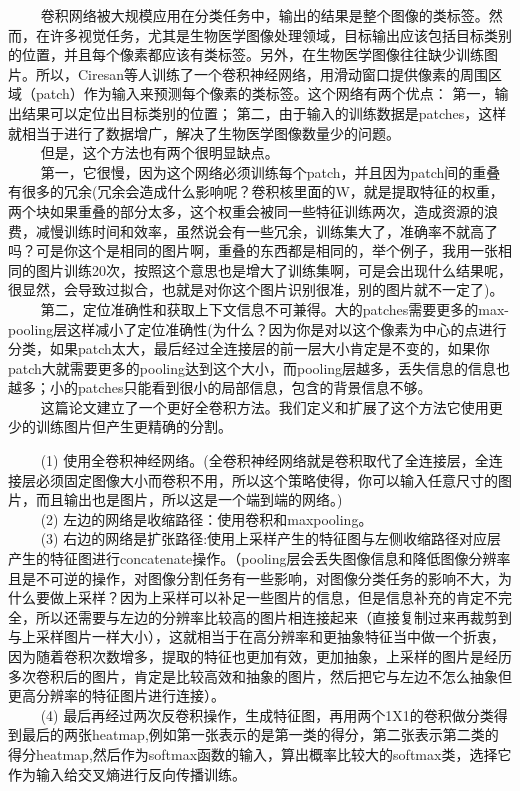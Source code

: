   
卷积网络被大规模应用在分类任务中，输出的结果是整个图像的类标签。然而，在许多视觉任务，尤其是生物医学图像处理领域，目标输出应该包括目标类别的位置，并且每个像素都应该有类标签。另外，在生物医学图像往往缺少训练图片。所以，Ciresan等人训练了一个卷积神经网络，用滑动窗口提供像素的周围区域（patch）作为输入来预测每个像素的类标签。这个网络有两个优点：
第一，输出结果可以定位出目标类别的位置；
第二，由于输入的训练数据是patches，这样就相当于进行了数据增广，解决了生物医学图像数量少的问题。\\
   但是，这个方法也有两个很明显缺点。\\
  
第一，它很慢，因为这个网络必须训练每个patch，并且因为patch间的重叠有很多的冗余(冗余会造成什么影响呢？卷积核里面的W，就是提取特征的权重，两个块如果重叠的部分太多，这个权重会被同一些特征训练两次，造成资源的浪费，减慢训练时间和效率，虽然说会有一些冗余，训练集大了，准确率不就高了吗？可是你这个是相同的图片啊，重叠的东西都是相同的，举个例子，我用一张相同的图片训练20次，按照这个意思也是增大了训练集啊，可是会出现什么结果呢，很显然，会导致过拟合，也就是对你这个图片识别很准，别的图片就不一定了)。\\
  
第二，定位准确性和获取上下文信息不可兼得。大的patches需要更多的max-pooling层这样减小了定位准确性(为什么？因为你是对以这个像素为中心的点进行分类，如果patch太大，最后经过全连接层的前一层大小肯定是不变的，如果你patch大就需要更多的pooling达到这个大小，而pooling层越多，丢失信息的信息也越多；小的patches只能看到很小的局部信息，包含的背景信息不够。\\
  
这篇论文建立了一个更好全卷积方法。我们定义和扩展了这个方法它使用更少的训练图片但产生更精确的分割。

\begin{figure}
\centering
\end{figure}

   (1)
使用全卷积神经网络。(全卷积神经网络就是卷积取代了全连接层，全连接层必须固定图像大小而卷积不用，所以这个策略使得，你可以输入任意尺寸的图片，而且输出也是图片，所以这是一个端到端的网络。)\\
   (2) 左边的网络是收缩路径：使用卷积和maxpooling。\\
   (3)
右边的网络是扩张路径:使用上采样产生的特征图与左侧收缩路径对应层产生的特征图进行concatenate操作。（pooling层会丢失图像信息和降低图像分辨率且是不可逆的操作，对图像分割任务有一些影响，对图像分类任务的影响不大，为什么要做上采样？因为上采样可以补足一些图片的信息，但是信息补充的肯定不完全，所以还需要与左边的分辨率比较高的图片相连接起来（直接复制过来再裁剪到与上采样图片一样大小），这就相当于在高分辨率和更抽象特征当中做一个折衷，因为随着卷积次数增多，提取的特征也更加有效，更加抽象，上采样的图片是经历多次卷积后的图片，肯定是比较高效和抽象的图片，然后把它与左边不怎么抽象但更高分辨率的特征图片进行连接）。\\
   (4)
最后再经过两次反卷积操作，生成特征图，再用两个1X1的卷积做分类得到最后的两张heatmap,例如第一张表示的是第一类的得分，第二张表示第二类的得分heatmap,然后作为softmax函数的输入，算出概率比较大的softmax类，选择它作为输入给交叉熵进行反向传播训练。

